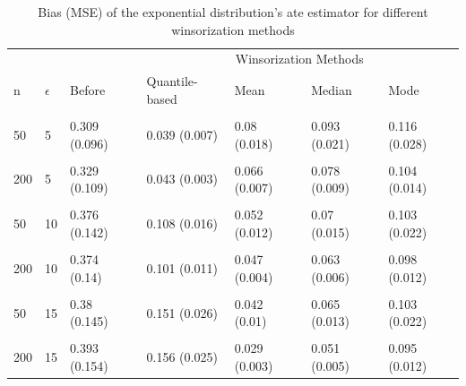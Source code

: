 \documentclass[notitlepage,12pt]{jedm}
\begin{document}
\begin{table}[H]

\caption{\label{tab:unnamed-chunk-7}Bias (MSE) of the exponential distribution's ate estimator for different winsorization methods}
\centering
\begin{tabular}[t]{l|l|l|l|l|l|l}
\hline
\multicolumn{3}{c|}{ } & \multicolumn{4}{c}{Winsorization Methods} \\
\cline{4-7}
n & $\epsilon$ & Before & Quantile-based & Mean & Median & Mode\\
\hline
\cellcolor{gray!6}{20} & \cellcolor{gray!6}{5} & \cellcolor{gray!6}{0.359 (0.13)} & \cellcolor{gray!6}{0.069 (0.017)} & \cellcolor{gray!6}{0.077 (0.033)} & \cellcolor{gray!6}{0.092 (0.037)} & \cellcolor{gray!6}{0.115 (0.045)}\\
\hline
50 & 5 & 0.309 (0.096) & 0.039 (0.007) & 0.08 (0.018) & 0.093 (0.021) & 0.116 (0.028)\\
\hline
\cellcolor{gray!6}{100} & \cellcolor{gray!6}{5} & \cellcolor{gray!6}{0.335 (0.113)} & \cellcolor{gray!6}{0.045 (0.004)} & \cellcolor{gray!6}{0.07 (0.01)} & \cellcolor{gray!6}{0.082 (0.012)} & \cellcolor{gray!6}{0.107 (0.018)}\\
\hline
200 & 5 & 0.329 (0.109) & 0.043 (0.003) & 0.066 (0.007) & 0.078 (0.009) & 0.104 (0.014)\\
\hline
\cellcolor{gray!6}{20} & \cellcolor{gray!6}{10} & \cellcolor{gray!6}{0.382 (0.147)} & \cellcolor{gray!6}{0.13 (0.025)} & \cellcolor{gray!6}{0.055 (0.024)} & \cellcolor{gray!6}{0.076 (0.029)} & \cellcolor{gray!6}{0.106 (0.038)}\\
\hline
50 & 10 & 0.376 (0.142) & 0.108 (0.016) & 0.052 (0.012) & 0.07 (0.015) & 0.103 (0.022)\\
\hline
\cellcolor{gray!6}{100} & \cellcolor{gray!6}{10} & \cellcolor{gray!6}{0.375 (0.141)} & \cellcolor{gray!6}{0.102 (0.012)} & \cellcolor{gray!6}{0.051 (0.007)} & \cellcolor{gray!6}{0.069 (0.009)} & \cellcolor{gray!6}{0.103 (0.016)}\\
\hline
200 & 10 & 0.374 (0.14) & 0.101 (0.011) & 0.047 (0.004) & 0.063 (0.006) & 0.098 (0.012)\\
\hline
\cellcolor{gray!6}{20} & \cellcolor{gray!6}{15} & \cellcolor{gray!6}{0.395 (0.157)} & \cellcolor{gray!6}{0.179 (0.038)} & \cellcolor{gray!6}{0.038 (0.018)} & \cellcolor{gray!6}{0.064 (0.022)} & \cellcolor{gray!6}{0.1 (0.032)}\\
\hline
50 & 15 & 0.38 (0.145) & 0.151 (0.026) & 0.042 (0.01) & 0.065 (0.013) & 0.103 (0.022)\\
\hline
\cellcolor{gray!6}{100} & \cellcolor{gray!6}{15} & \cellcolor{gray!6}{0.393 (0.155)} & \cellcolor{gray!6}{0.159 (0.026)} & \cellcolor{gray!6}{0.03 (0.004)} & \cellcolor{gray!6}{0.053 (0.007)} & \cellcolor{gray!6}{0.096 (0.014)}\\
\hline
200 & 15 & 0.393 (0.154) & 0.156 (0.025) & 0.029 (0.003) & 0.051 (0.005) & 0.095 (0.012)\\
\hline
\end{tabular}
\end{table}
\end{document}
